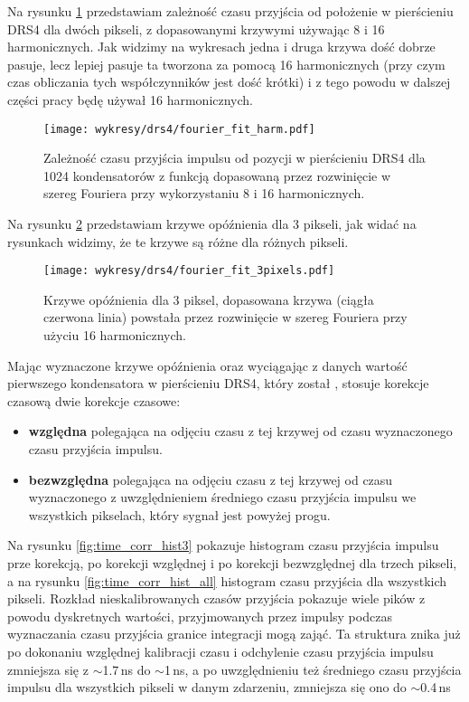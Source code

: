 \documentclass[a4paper,11pt,twoside]{article}
\begin{document}
Na rysunku \ref{fig:fourier_fit_harm} przedstawiam zależność czasu przyjścia od położenie w pierścieniu DRS4 dla dwóch pikseli, z dopasowanymi krzywymi używając 8 i 16 harmonicznych. Jak widzimy na wykresach jedna i druga krzywa dość dobrze pasuje, lecz lepiej pasuje ta tworzona za pomocą 16 harmonicznych (przy czym czas obliczania tych współczynników jest dość krótki) i z tego powodu w dalszej części pracy będę używał 16 harmonicznych.
\begin{figure}[H] 
\centering
\texttt{[image: wykresy/drs4/fourier\_fit\_harm.pdf]}
\caption{Zależność czasu przyjścia impulsu od pozycji w pierścieniu DRS4 dla 1024 kondensatorów z funkcją dopasowaną przez rozwinięcie w szereg Fouriera przy wykorzystaniu 8 i 16 harmonicznych.}
\label{fig:fourier_fit_harm}
\end{figure}
Na rysunku \ref{fig:fourier_fit_3} przedstawiam krzywe opóźnienia dla 3 pikseli, jak widać na rysunkach widzimy, że te krzywe są różne dla różnych pikseli. 
\begin{figure}[H] 
\centering
\texttt{[image: wykresy/drs4/fourier\_fit\_3pixels.pdf]}
\caption{Krzywe opóźnienia dla 3 piksel, dopasowana krzywa (ciągła czerwona linia) powstała przez rozwinięcie w szereg Fouriera przy użyciu 16 harmonicznych.}
\label{fig:fourier_fit_3}
\end{figure}
Mając wyznaczone krzywe opóźnienia oraz wyciągając z danych wartość pierwszego kondensatora w pierścieniu DRS4, który został , stosuje korekcje czasową dwie korekcje czasowe:
\begin{itemize}
\item {\bf{względna}} polegająca na odjęciu  czasu z tej krzywej od czasu wyznaczonego czasu przyjścia impulsu.
\item {\bf{bezwzględna}} polegająca na odjęciu czasu z tej krzywej od czasu wyznaczonego z uwzględnieniem średniego czasu przyjścia impulsu we wszystkich pikselach, który sygnał jest powyżej progu.
\end{itemize} 
Na rysunku \ref{fig:time_corr_hist3} pokazuje histogram czasu przyjścia impulsu prze korekcją, po korekcji względnej i po korekcji bezwzględnej dla trzech pikseli, a na rysunku \ref{fig:time_corr_hist_all} histogram czasu przyjścia dla wszystkich pikseli. Rozkład nieskalibrowanych czasów przyjścia pokazuje wiele pików z powodu dyskretnych wartości, przyjmowanych przez impulsy podczas wyznaczania czasu przyjścia
granice integracji mogą zająć. Ta struktura  znika już po dokonaniu  względnej kalibracji czasu i odchylenie czasu przyjścia impulsu zmniejsza się z $\sim$1.7\,ns do $\sim$1\,ns, a po uwzględnieniu też średniego czasu przyjścia impulsu dla wszystkich pikseli w danym zdarzeniu, zmniejsza się ono do $\sim$0.4\,ns
\end{document}
